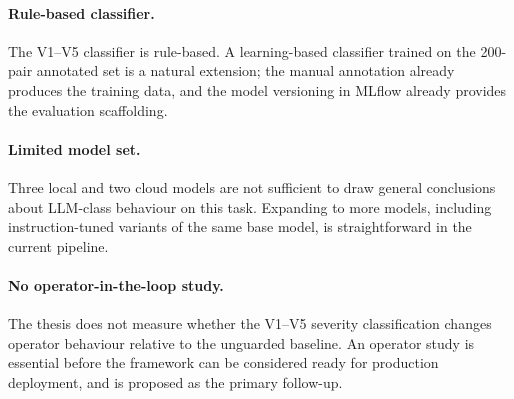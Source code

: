 \paragraph{Rule-based classifier.} The V1--V5 classifier is rule-based. A
learning-based classifier trained on the 200-pair annotated set is a
natural extension; the manual annotation already produces the training
data, and the model versioning in MLflow already provides the evaluation
scaffolding.

\paragraph{Limited model set.} Three local and two cloud models are not
sufficient to draw general conclusions about LLM-class behaviour on this
task. Expanding to more models, including instruction-tuned variants of
the same base model, is straightforward in the current pipeline.

\paragraph{No operator-in-the-loop study.} The thesis does not measure
whether the V1--V5 severity classification changes operator behaviour
relative to the unguarded baseline. An operator study is essential before
the framework can be considered ready for production deployment, and is
proposed as the primary follow-up.
